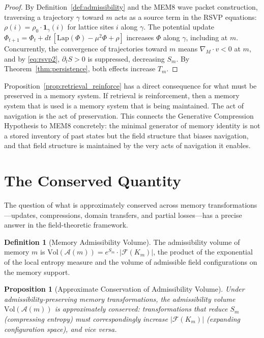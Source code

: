 \documentclass[12pt, oneside]{book}
\theoremstyle{flyxion}
\newtheorem{proposition}[theorem]{Proposition}
\theoremstyle{definition}
\newtheorem{definition}[theorem]{Definition}
\begin{document}
\begin{proof}
By Definition~\ref{def:admissibility} and the
MEM\textbar{}8 wave packet construction, traversing
a trajectory $\gamma$ toward $m$ acts as a source
term in the RSVP equations: $\rho(i) = \rho_0
\cdot \mathbf{1}_{\gamma}(i)$ for lattice sites
$i$ along $\gamma$. The potential update
$\Phi_{t+1} = \Phi_t + dt\,[\mathrm{Lap}(\Phi) -
\mu^2\Phi + \rho]$ increases $\Phi$ along $\gamma$,
including at $m$. Concurrently, the convergence of
trajectories toward $m$ means $\nabla_M \cdot v < 0$
at $m$, and by \eqref{eq:rsvp2}, $\partial_t S > 0$
is suppressed, decreasing $S_m$. By
Theorem~\ref{thm:persistence}, both effects increase
$T_m$.
\end{proof}

Proposition~\ref{prop:retrieval_reinforce} has a
direct consequence for what must be preserved in a
memory system. If retrieval is reinforcement, then
a memory system that is used is a memory system that
is being maintained. The act of navigation is the
act of preservation. This connects the Generative
Compression Hypothesis to MEM\textbar{}8 concretely:
the minimal generator of memory identity is not a
stored inventory of past states but the field
structure that biases navigation, and that field
structure is maintained by the very acts of
navigation it enables.

\section{The Conserved Quantity}

The question of what is approximately conserved
across memory transformations---updates, compressions,
domain transfers, and partial losses---has a precise
answer in the field-theoretic framework.

\begin{definition}[Memory Admissibility Volume]
The admissibility volume of memory $m$ is
$\mathrm{Vol}(\mathcal{A}(m)) = e^{S_m} \cdot
|\mathcal{F}(K_m)|$, the product of the exponential
of the local entropy measure and the volume of
admissible field configurations on the memory
support.
\end{definition}

\begin{proposition}[Approximate Conservation of Admissibility Volume]
Under admissibility-preserving memory transformations,
the admissibility volume $\mathrm{Vol}(\mathcal{A}(m))$
is approximately conserved: transformations that
reduce $S_m$ (compressing entropy) must correspondingly
increase $|\mathcal{F}(K_m)|$ (expanding configuration space), and vice versa.
\end{proposition}
\end{document}
